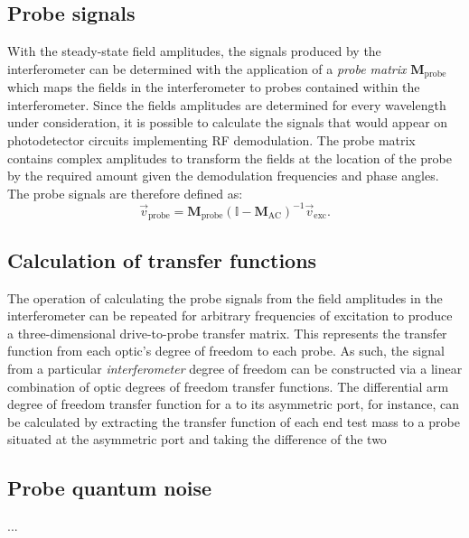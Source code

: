 \subsection{Probe signals}
With the steady-state field amplitudes, the signals produced by the interferometer can be determined with the application of a \emph{probe matrix} $\mathbf{M}_{\text{probe}}$ which maps the fields in the interferometer to probes contained within the interferometer. Since the fields amplitudes are determined for every wavelength under consideration, it is possible to calculate the signals that would appear on photodetector circuits implementing RF demodulation. The probe matrix contains complex amplitudes to transform the fields at the location of the probe by the required amount given the demodulation frequencies and phase angles. The probe signals are therefore defined as:
\begin{equation}
  \vec{v}_{\text{probe}} = \mathbf{M}_{\text{probe}} \left( \mathbb{I} - \mathbf{M}_{\text{AC}} \right)^{-1} \vec{v}_{\text{exc}}.
\end{equation}

\subsection{Calculation of transfer functions}
The operation of calculating the probe signals from the field amplitudes in the interferometer can be repeated for arbitrary frequencies of excitation to produce a three-dimensional drive-to-probe transfer matrix. This represents the transfer function from each optic's degree of freedom to each probe. As such, the signal from a particular \emph{interferometer} degree of freedom can be constructed via a linear combination of optic degrees of freedom transfer functions. The differential arm degree of freedom transfer function for a \MI to its asymmetric port, for instance, can be calculated by extracting the transfer function of each end test mass to a probe situated at the asymmetric port and taking the difference of the two 

\subsection{Probe quantum noise}
...

